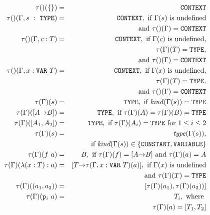 \documentclass [12pt,twoside]{cslreport}
\newcommand{\thmbox}
   {{\ \hfill\hbox{%
      \vrule width1.0ex height1.0ex
   }\parfillskip 0pt }}
\newcommand{\aro}{\mathord\rightarrow} %
\newcommand{\funtype}[2]{[#1 \aro #2]}
\newcommand{\tupletype}[1]{[#1]}
\newcommand{\tauGamma}[1]{\tau(\Gamma)(#1)}
\newcommand{\proj}[1]{\mathtt{p}_{#1}}
\newcommand{\listwo}[2]{#1_{1}, #1_{2}}
\newcommand{\tttype}{\mathtt{TYPE}}
\newcommand{\ttcontext}{\mathtt{CONTEXT}}
\newcommand{\ttvar}{\mathtt{VAR}}
\newcommand{\ttconstant}{\mathtt{CONSTANT}}
\newcommand{\ttvariable}{\mathtt{VARIABLE}}
\newenvironment{Defn}[1]{\begin{definition}[#1]\label{defn:#1}}{
\thmbox\end{definition}}
\begin{document}
\begin{Defn}{type rules}
\begin{eqnarray*}
  \tau()(\{\}) & = & \ttcontext \\
%
  \tau()(\Gamma, s\ :\ \tttype{}) & = & \ttcontext, \mbox{ if }
  \Gamma(s) \mbox{ is undefined}\\& &
  \mbox{and } \tau()(\Gamma) = \ttcontext\\
%
  \tau()(\Gamma, c : T) & = & \ttcontext, \mbox{ if }
   \Gamma(c) \mbox{ is undefined,}\\ & & 
\tauGamma{T} =
      \tttype{},\\
   & & \mbox{and } \tau()(\Gamma) = \ttcontext\\
%
  \tau()(\Gamma, x : \ttvar{}\ T) & = & \ttcontext, \mbox{ if }
  \Gamma(x) \mbox{ is undefined,}\\ & & 
\tauGamma{T}
    = \tttype{},\\
    & & \mbox{and } \tau()(\Gamma) = \ttcontext\\ 
%
  \tauGamma{s} & = & \tttype{}, \mbox{ if } \textit{kind\/}(\Gamma(s)) =
\tttype{}\\
%
  \tauGamma{\funtype{A}{B}} & = & \tttype{}, \mbox{ if } \tauGamma{A} =
     \tauGamma{B} = \tttype{}\\
%
  \tauGamma{\tupletype{\listwo{A}{n}}} & = & \tttype{}, \mbox{ if }
     \tauGamma{A_i} = \tttype{} \mbox{ for } 1\leq i\leq 2 \\
%
  \tau(\Gamma)(s) & = &  \textit{type\/}(\Gamma(s)),\\
                    & &  \mbox{ if } 
\textit{kind}(\Gamma(s)) \in \{ \ttconstant{}, \ttvariable \} \\
%
 \tau(\Gamma)(f\ a) & = & B, \mbox{ if } \tau(\Gamma)(f) = \funtype{A}{B}
\mbox{ and } \tau(\Gamma)(a) = A \\
%
\tauGamma{\lambda (x : T): a} & = & \funtype{T}{\tau(\Gamma, x : \ttvar{}\ T)(a)},
\mbox{ if } \Gamma(x) \mbox{ is undefined}\\& & 
  \mbox{and }\tauGamma{T} = \tttype{}\\
%
\tau(\Gamma)((a_1, a_2)) & = &
    [\tau(\Gamma)(a_1),  \tau(\Gamma)(a_2))]\\
%
\tau(\Gamma)(\proj{i}\ a) & = & T_i, \mbox{ where }\\ & & 
 \tau(\Gamma)(a) = [T_1, T_2] %
\end{eqnarray*}
\end{Defn}
\end{document}
